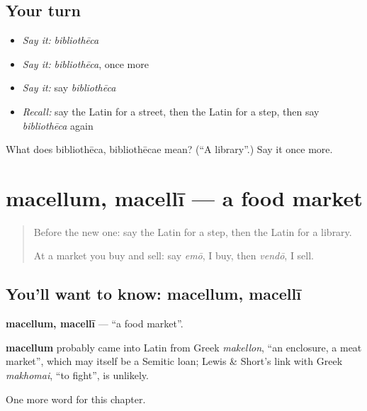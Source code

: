 \subsection*{Your turn}
\begin{itemize}
\raggedright
  \item \emph{Say it:} \emph{bibliothēca}
  \item \emph{Say it:} \emph{bibliothēca}, once more
  \item \emph{Say it:} say \emph{bibliothēca}
  \item \emph{Recall:} say the Latin for a street, then the Latin for a step, then say \emph{bibliothēca} again
\end{itemize}

\begin{tcolorbox}[breakable,colback=teal!4,colframe=teal!35!black,title={Before you move on}]
What does bibliothēca, bibliothēcae mean? (\textquotedblleft{}A library\textquotedblright{}.) Say it once more.
\end{tcolorbox}
\section[macellum, macellī]{macellum, macellī — a food market}

\label{lesson:LA-C117-macellum}



\begin{quote}
Before the new one: say the Latin for a step, then the Latin for a library.

At a market you buy and sell: say \emph{emō}, I buy, then \emph{vendō}, I sell.
\end{quote}

\subsection*{You'll want to know: macellum, macellī}
\textbf{macellum, macellī} — \textquotedblleft{}a food market\textquotedblright{}.

\begin{cousinweb}
\textbf{macellum} probably came into Latin from Greek \emph{makellon}, \textquotedblleft{}an enclosure, a meat market\textquotedblright{}, which may itself be a Semitic loan; Lewis \& Short's link with Greek \emph{makhomai}, \textquotedblleft{}to fight\textquotedblright{}, is unlikely.
\end{cousinweb}

\begin{grammarlens}[title={What you've built}]
One more word for this chapter.
\end{grammarlens}

